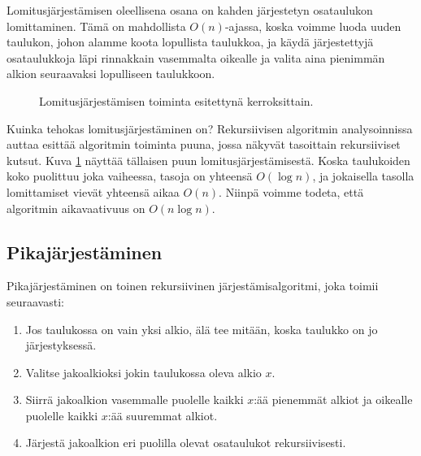 Lomitusjärjestämisen oleellisena osana on kahden järjestetyn osataulukon
lomittaminen. Tämä on mahdollista $O(n)$-ajassa, koska
voimme luoda uuden taulukon, johon alamme koota lopullista taulukkoa,
ja käydä järjestettyjä osataulukkoja läpi rinnakkain
vasemmalta oikealle ja valita aina pienimmän alkion seuraavaksi
lopulliseen taulukkoon.

\begin{figure}
\center
{}
\caption{Lomitusjärjestämisen toiminta esitettynä kerroksittain.}
\label{fig:lomjar}
\end{figure}

Kuinka tehokas lomitusjärjestäminen on?
Rekursiivisen algoritmin analysoinnissa auttaa esittää
algoritmin toiminta puuna,
jossa näkyvät tasoittain rekursiiviset kutsut.
Kuva \ref{fig:lomjar} näyttää tällaisen puun lomitusjärjestämisestä.
Koska taulukoiden koko puolittuu joka vaiheessa,
tasoja on yhteensä $O(\log n)$,
ja jokaisella tasolla lomittamiset vievät yhteensä aikaa $O(n)$.
Niinpä voimme todeta, että algoritmin aikavaativuus on $O(n \log n)$.

\subsection{Pikajärjestäminen}

Pikajärjestäminen on toinen rekursiivinen järjestämisalgoritmi,
joka toimii seuraavasti:

\begin{enumerate}
\item Jos taulukossa on vain yksi alkio,
älä tee mitään, koska taulukko on jo järjestyksessä.
\item Valitse jakoalkioksi jokin taulukossa oleva alkio $x$.
\item Siirrä jakoalkion vasemmalle puolelle kaikki $x$:ää pienemmät alkiot
ja oikealle puolelle kaikki $x$:ää suuremmat alkiot.
\item Järjestä jakoalkion eri puolilla olevat osataulukot rekursiivisesti.
\end{enumerate}

